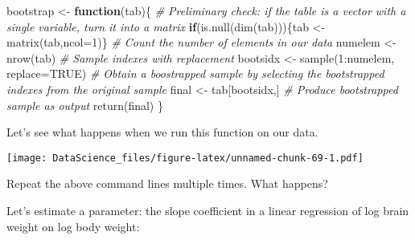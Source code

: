 \documentclass[
]{book}
\newenvironment{Shaded}{\begin{snugshade}}{\end{snugshade}}
\newcommand{\AttributeTok}[1]{\textcolor[rgb]{0.77,0.63,0.00}{#1}}
\newcommand{\CommentTok}[1]{\textcolor[rgb]{0.56,0.35,0.01}{\textit{#1}}}
\newcommand{\ConstantTok}[1]{\textcolor[rgb]{0.00,0.00,0.00}{#1}}
\newcommand{\ControlFlowTok}[1]{\textcolor[rgb]{0.13,0.29,0.53}{\textbf{#1}}}
\newcommand{\DecValTok}[1]{\textcolor[rgb]{0.00,0.00,0.81}{#1}}
\newcommand{\FunctionTok}[1]{\textcolor[rgb]{0.00,0.00,0.00}{#1}}
\newcommand{\NormalTok}[1]{#1}
\newcommand{\OtherTok}[1]{\textcolor[rgb]{0.56,0.35,0.01}{#1}}
\newcommand{\SpecialCharTok}[1]{\textcolor[rgb]{0.00,0.00,0.00}{#1}}
\begin{document}
\begin{Shaded}
\begin{Highlighting}[]
\NormalTok{bootstrap }\OtherTok{\textless{}{-}} \ControlFlowTok{function}\NormalTok{(tab)\{}
  \CommentTok{\# Preliminary check: if the table is a vector with a single variable, turn it into a matrix}
  \ControlFlowTok{if}\NormalTok{(}\FunctionTok{is.null}\NormalTok{(}\FunctionTok{dim}\NormalTok{(tab)))\{tab }\OtherTok{\textless{}{-}} \FunctionTok{matrix}\NormalTok{(tab,}\AttributeTok{ncol=}\DecValTok{1}\NormalTok{)\}}
  \CommentTok{\# Count the number of elements in our data}
\NormalTok{  numelem }\OtherTok{\textless{}{-}} \FunctionTok{nrow}\NormalTok{(tab)}
  \CommentTok{\# Sample indexes with replacement}
\NormalTok{  bootsidx }\OtherTok{\textless{}{-}} \FunctionTok{sample}\NormalTok{(}\DecValTok{1}\SpecialCharTok{:}\NormalTok{numelem, }\AttributeTok{replace=}\ConstantTok{TRUE}\NormalTok{)}
  \CommentTok{\# Obtain a boostrapped sample by selecting the bootstrapped indexes from the original sample}
\NormalTok{  final }\OtherTok{\textless{}{-}}\NormalTok{ tab[bootsidx,]}
  \CommentTok{\# Produce bootstrapped sample as output}
  \FunctionTok{return}\NormalTok{(final)}
\NormalTok{\}}
\end{Highlighting}
\end{Shaded}

Let's see what happens when we run this function on our data.

\begin{Shaded}
\end{Shaded}

\texttt{[image: DataScience\_files/figure-latex/unnamed-chunk-69-1.pdf]}

Repeat the above command lines multiple times. What happens?

Let's estimate a parameter: the slope coefficient in a linear regression of log brain weight on log body weight:

\begin{Shaded}
\end{Shaded}
\end{document}
